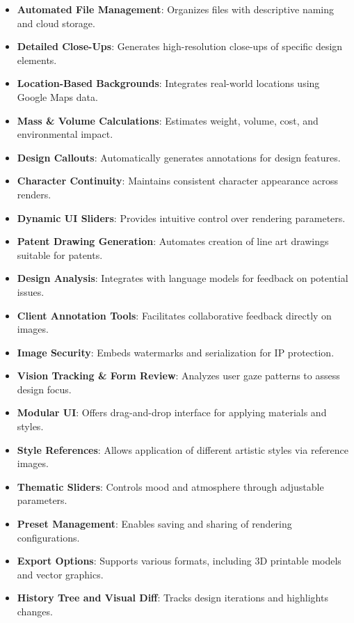 \documentclass{article}
\begin{document}
\begin{itemize}
    \item \textbf{Automated File Management}: Organizes files with descriptive naming and cloud storage.
    \item \textbf{Detailed Close-Ups}: Generates high-resolution close-ups of specific design elements.
    \item \textbf{Location-Based Backgrounds}: Integrates real-world locations using Google Maps data.
    \item \textbf{Mass \& Volume Calculations}: Estimates weight, volume, cost, and environmental impact.
    \item \textbf{Design Callouts}: Automatically generates annotations for design features.
    \item \textbf{Character Continuity}: Maintains consistent character appearance across renders.
    \item \textbf{Dynamic UI Sliders}: Provides intuitive control over rendering parameters.
    \item \textbf{Patent Drawing Generation}: Automates creation of line art drawings suitable for patents.
    \item \textbf{Design Analysis}: Integrates with language models for feedback on potential issues.
    \item \textbf{Client Annotation Tools}: Facilitates collaborative feedback directly on images.
    \item \textbf{Image Security}: Embeds watermarks and serialization for IP protection.
    \item \textbf{Vision Tracking \& Form Review}: Analyzes user gaze patterns to assess design focus.
    \item \textbf{Modular UI}: Offers drag-and-drop interface for applying materials and styles.
    \item \textbf{Style References}: Allows application of different artistic styles via reference images.
    \item \textbf{Thematic Sliders}: Controls mood and atmosphere through adjustable parameters.
    \item \textbf{Preset Management}: Enables saving and sharing of rendering configurations.
    \item \textbf{Export Options}: Supports various formats, including 3D printable models and vector graphics.
    \item \textbf{History Tree and Visual Diff}: Tracks design iterations and highlights changes.
\end{itemize}
\end{document}
